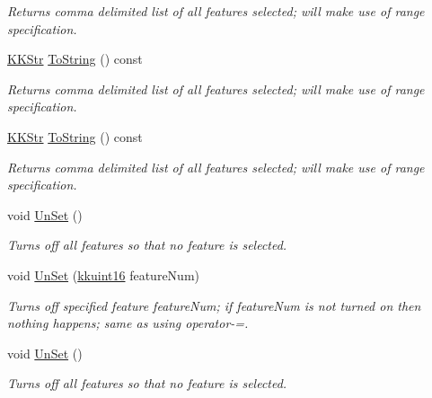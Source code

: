 \begin{DoxyCompactItemize}
\begin{DoxyCompactList}\small\item\em Returns comma delimited list of all features selected; will make use of range specification. \end{DoxyCompactList}\item 
\hyperlink{class_k_k_b_1_1_k_k_str}{K\+K\+Str} \hyperlink{class_k_k_m_l_l_1_1_feature_num_list_ac96d441218dc767332fff806b0103bc3}{To\+String} () const 
\begin{DoxyCompactList}\small\item\em Returns comma delimited list of all features selected; will make use of range specification. \end{DoxyCompactList}\item 
\hyperlink{class_k_k_b_1_1_k_k_str}{K\+K\+Str} \hyperlink{class_k_k_m_l_l_1_1_feature_num_list_a605c16651ab570da526bd3648e3ec654}{To\+String} () const 
\begin{DoxyCompactList}\small\item\em Returns comma delimited list of all features selected; will make use of range specification. \end{DoxyCompactList}\item 
void \hyperlink{class_k_k_m_l_l_1_1_feature_num_list_a22f76daeffbc1d2e90936c0f8d25f482}{Un\+Set} ()
\begin{DoxyCompactList}\small\item\em Turns off all features so that no feature is selected. \end{DoxyCompactList}\item 
void \hyperlink{class_k_k_m_l_l_1_1_feature_num_list_a5cd3762dfe7881f3e0dbf8435d0bd9aa}{Un\+Set} (\hyperlink{namespace_k_k_b_aa8c7d4d30381c8a0b6fce68974a9c8a9}{kkuint16} feature\+Num)
\begin{DoxyCompactList}\small\item\em Turns off specified feature \textquotesingle{}feature\+Num\textquotesingle{}; if \textquotesingle{}feature\+Num\textquotesingle{} is not turned on then nothing happens; same as using \textquotesingle{}operator-\/=\textquotesingle{}. \end{DoxyCompactList}\item 
void \hyperlink{class_k_k_m_l_l_1_1_feature_num_list_a976cf35611030ab33f8932950dae2303}{Un\+Set} ()
\begin{DoxyCompactList}\small\item\em Turns off all features so that no feature is selected. \end{DoxyCompactList}\item 

\end{DoxyCompactItemize}
